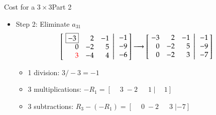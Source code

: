 \documentclass[10pt]{beamer}
\begin{document}
\begin{frame}{Cost for a $3\times 3$}{Part 2}
\begin{itemize}

\item Step 2: Eliminate $a_{31}$
$$
        \left[\left.\negthickspace\begin{array}{rrr} \boxed{-3} &  2 & -1 \\
                                                    0 & -2 &  5 \\
                                                    \textcolor{red}{3} & -4 &  4 \end{array}
           \right|\begin{array}{r} -1 \\ -9 \\ -6 \end{array}\negthickspace\right]
            \longrightarrow
        \left[\left.\negthickspace\begin{array}{rrr}  -3 &  2 & -1 \\
                                                    0 & -2 &  5 \\
                                                    0 & -2 &  3 \end{array}
           \right|\begin{array}{r} -1 \\ -9 \\ -7 \end{array}\negthickspace\right]
$$
\begin{itemize}
    \item 1 division: $3/-3 = -1$
    \item 3 multiplications: $-R_1 = [\phantom{-}3\; -2\; \phantom{-}1\; | \phantom{-}1]$
    \item 3 subtractions: $R_3 - (-R_1) = [\phantom{-}0\; -2\; \phantom{-}3\; | -7]$ 
\end{itemize}


\end{itemize}
\end{frame}
\end{document}
